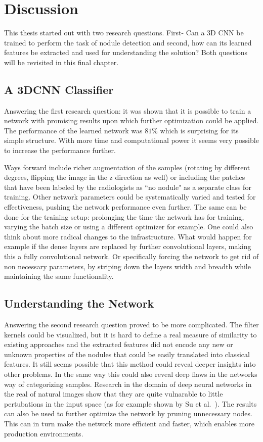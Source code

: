 \documentclass[main.tex]{subfiles}
\begin{document}
\chapter{Discussion}\label{chap:discussion}
This thesis started out with two research questions. First- Can a 3D CNN be trained to perform the task of nodule detection and second, how can its learned features be extracted and used for understanding the solution? Both questions will be revisited in this final chapter.

\section{A 3DCNN Classifier}
Answering the first research question: it was shown that it is possible to train a network with promising results upon which further optimization could be applied. The performance of the learned network was $81\%$ which is surprising for its simple structure. With more time and computational power it seems very possible to increase the performance further. 

Ways forward include richer augmentation of the samples (rotating by different degrees, flipping the image in the z direction as well) or including the patches that have been labeled by the radiologists as ``no nodule" as a separate class for training. Other network parameters could be systematically varied and tested for effectiveness, pushing the network performance even further. The same can be done for the training setup: prolonging the time the network has for training, varying the batch size or using a different optimizer for example. One could also think about more radical changes to the infrastructure. What would happen for example if the dense layers are replaced by further convolutional layers, making this a fully convolutional network. Or specifically forcing the network to get rid of non necessary parameters, by striping down the layers width and breadth while maintaining the same functionality.

\section{Understanding the Network}
Answering the second research question proved to be more complicated. The filter kernels could be visualized, but it is hard to define a real measure of similarity to existing approaches and the extracted features did not encode any new or unknown properties of the nodules that could be easily translated into classical features. It still seems possible that this method could reveal deeper insights into other problems. In the same way this could also reveal deep flaws in the networks way of categorizing samples. Research in the domain of deep neural networks in the real of natural images show that they are quite vulnarable to little pertubations in the input space (as for example shown by Su et al.~\cite{su2017one}). The results can also be used to further optimize the network by pruning unnecessary nodes. This can in turn make the network more efficient and faster, which enables more production environments.
\end{document}

